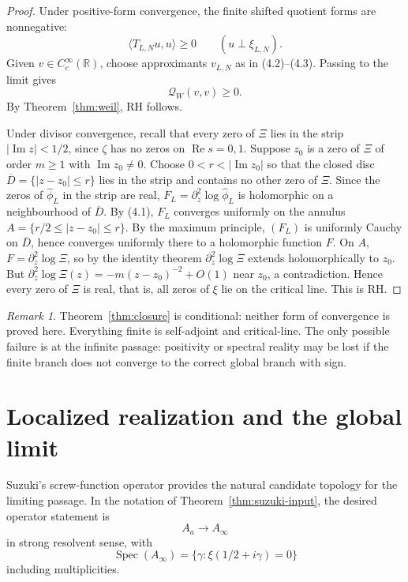 \documentclass[11pt]{amsart}
\theoremstyle{definition}
\theoremstyle{remark}
\newtheorem{remark}[theorem]{Remark}
\newcommand{\R}{\mathbb R}
\newcommand{\QW}{\mathcal Q_W}
\newcommand{\XiR}{\Xi}
\DeclareMathOperator{\Spec}{Spec}
\begin{document}
\begin{proof}
Under positive-form convergence, the finite shifted quotient forms are
nonnegative:
\[
 \langle T_{L,N}u,u\rangle\ge0
 \qquad(u\perp\xi_{L,N}).
\tag{5.1}
\]
Given \(v\in C_c^\infty(\R)\), choose approximants \(v_{L,N}\) as in
(4.2)--(4.3).  Passing to the limit gives
\[
 \QW(v,v)\ge0.
\tag{5.2}
\]
By Theorem~\ref{thm:weil}, RH follows.

Under divisor convergence, recall that every zero of \(\XiR\) lies in
the strip \(|\operatorname{Im}z|<1/2\), since \(\zeta\) has no zeros on
\(\operatorname{Re}s=0,1\).  Suppose \(z_0\) is a zero of \(\XiR\) of
order \(m\ge1\) with \(\operatorname{Im}z_0\ne0\).  Choose
\(0<r<|\operatorname{Im}z_0|\) so that the closed disc
\(\overline D=\{|z-z_0|\le r\}\) lies in the strip and contains no other
zero of \(\XiR\).  Since the zeros of \(\widehat\phi_L\) in the strip
are real, \(F_L=\partial_z^2\log\widehat\phi_L\) is holomorphic on a
neighbourhood of \(\overline D\).  By (4.1), \(F_L\) converges uniformly
on the annulus \(A=\{r/2\le|z-z_0|\le r\}\).  By the maximum principle,
\((F_L)\) is uniformly Cauchy on \(\overline D\), hence converges
uniformly there to a holomorphic function \(F\).  On \(A\),
\(F=\partial_z^2\log\XiR\), so by the identity theorem
\(\partial_z^2\log\XiR\) extends holomorphically to \(z_0\).  But
\(\partial_z^2\log\XiR(z)=-m(z-z_0)^{-2}+O(1)\) near \(z_0\), a
contradiction.  Hence every zero of \(\XiR\) is real, that is, all
zeros of \(\xi\) lie on the critical line.  This is RH.
\end{proof}

\begin{remark}
Theorem~\ref{thm:closure} is conditional: neither form of convergence is
proved here.  Everything finite is self-adjoint and critical-line.  The only possible failure is at
the infinite passage: positivity or spectral reality may be lost if the
finite branch does not converge to the correct global branch with sign.
\end{remark}

\section{Localized realization and the global limit}

Suzuki's screw-function operator provides the natural candidate topology for
the limiting passage.  In the notation of Theorem~\ref{thm:suzuki-input},
the desired operator statement is
\[
 A_a \longrightarrow A_\infty
\tag{6.1}
\]
in strong resolvent sense, with
\[
 \Spec(A_\infty)=\{\gamma:\xi(1/2+i\gamma)=0\}
\tag{6.2}
\]
including multiplicities.
\end{document}
